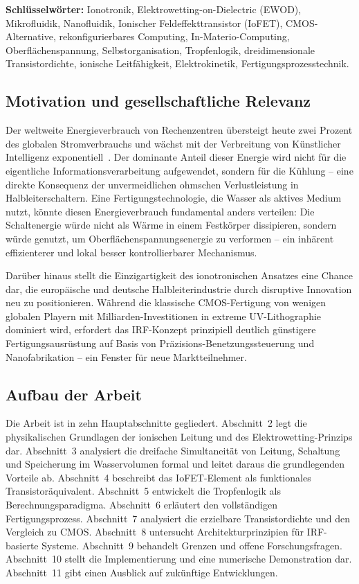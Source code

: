 ﻿\documentclass[a4paper,12pt]{scrreprt}
\theoremstyle{definition}
\begin{document}
\textbf{Schlüsselwörter:} Ionotronik, Elektrowetting-on-Dielectric (EWOD),
Mikrofluidik, Nanofluidik, Ionischer Feldeffekttransistor (IoFET), CMOS-Alternative,
rekonfigurierbares Computing, In-Materio-Computing, Oberflächenspannung,
Selbstorganisation, Tropfenlogik, dreidimensionale Transistordichte,
ionische Leitfähigkeit, Elektrokinetik, Fertigungsprozesstechnik.

\subsection{Motivation und gesellschaftliche Relevanz}

Der weltweite Energieverbrauch von Rechenzentren übersteigt heute zwei Prozent
des globalen Stromverbrauchs und wächst mit der Verbreitung von
Künstlicher Intelligenz exponentiell~\cite{iea2023}. Der dominante Anteil
dieser Energie wird nicht für die eigentliche Informationsverarbeitung
aufgewendet, sondern für die Kühlung -- eine direkte Konsequenz der
unvermeidlichen ohmschen Verlustleistung in Halbleiterschaltern. Eine
Fertigungstechnologie, die Wasser als aktives Medium nutzt, könnte
diesen Energieverbrauch fundamental anders verteilen: Die Schaltenergie
würde nicht als Wärme in einem Festkörper dissipieren, sondern würde
genutzt, um Oberflächenspannungsenergie zu verformen -- ein inhärent
effizienterer und lokal besser kontrollierbarer Mechanismus.

Darüber hinaus stellt die Einzigartigkeit des ionotronischen Ansatzes
eine Chance dar, die europäische und deutsche Halbleiterindustrie durch
disruptive Innovation neu zu positionieren. Während die klassische
CMOS-Fertigung von wenigen globalen Playern mit Milliarden-Investitionen
in extreme UV-Lithographie dominiert wird, erfordert das IRF-Konzept
prinzipiell deutlich günstigere Fertigungsausrüstung auf Basis von
Präzisions-Benetzungssteuerung und Nanofabrikation -- ein Fenster für
neue Marktteilnehmer.

\subsection{Aufbau der Arbeit}

Die Arbeit ist in zehn Hauptabschnitte gegliedert. Abschnitt~2 legt die
physikalischen Grundlagen der ionischen Leitung und des Elektrowetting-Prinzips
dar. Abschnitt~3 analysiert die dreifache Simultaneität von Leitung, Schaltung
und Speicherung im Wasservolumen formal und leitet daraus die grundlegenden
Vorteile ab. Abschnitt~4 beschreibt das IoFET-Element als funktionales
Transistoräquivalent. Abschnitt~5 entwickelt die Tropfenlogik als
Berechnungsparadigma. Abschnitt~6 erläutert den vollständigen Fertigungsprozess.
Abschnitt~7 analysiert die erzielbare Transistordichte und den Vergleich
zu CMOS. Abschnitt~8 untersucht Architekturprinzipien für IRF-basierte
Systeme. Abschnitt~9 behandelt Grenzen und offene Forschungsfragen. Abschnitt~10 stellt die Implementierung und eine numerische Demonstration dar. Abschnitt~11 gibt einen Ausblick auf zukünftige Entwicklungen.
\end{document}
